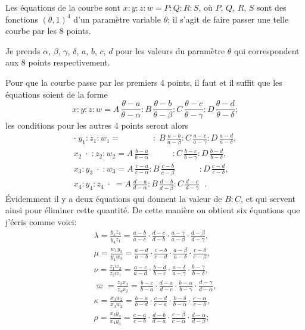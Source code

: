 \documentclass[12pt,a4paper,oneside]{book}
\theoremstyle{plain}
\theoremstyle{definition}
\theoremstyle{remark}
\begin{document}
\smallskip

Les \'equations de la courbe sont $x:y:z:w=P:Q:R:S$, o\`u $P$, $Q$, $R$, $S$ sont des fonctions $(\theta,1)^4$ d'un param\`etre variable $\theta$; il s'agit de faire passer une telle courbe par les 8 points.

Je prends $\alpha$, $\beta$, $\gamma$, $\delta$, $a$, $b$, $c$, $d$ pour les valeurs du param\`etre $\theta$ qui correspondent aux 8 points respectivement.

Pour que la courbe passe par les premiers 4 points, il faut et il suffit que les \'equations soient de la forme
\[
x:y:z:w=A\,\frac{\theta-a}{\theta-\alpha}:B\,\frac{\theta-b}{\theta-\beta}:C\,\frac{\theta-c}{\theta-\gamma}:D\,\frac{\theta-d}{\theta-\delta};
\]
les conditions pour les autres 4 points seront alors
\begin{gather*}
\cdot\; y_1:z_1:w_1=\phantom{=A\frac{b-a}{b-\alpha}}:\; B\,\frac{a-b}{a-\beta}:C\,\frac{a-c}{a-\gamma}:D\,\frac{a-d}{a-\delta},\\
x_2\;\cdot\;:z_2:w_2=A\,\frac{b-a}{b-\alpha}\phantom{:C\frac{b-c}{b-\gamma}}:C\,\frac{b-c}{b-\gamma}:D\,\frac{b-d}{b-\delta},\\
x_3:y_3\;\cdot\;:w_3=A\,\frac{c-a}{c-\alpha}:B\,\frac{c-b}{c-\beta}\phantom{:D\frac{c-d}{c-\delta}}:D\,\frac{c-d}{c-\delta},\\
x_4:y_4:z_4\;\cdot\;=A\,\frac{d-a}{d-\alpha}:B\,\frac{d-b}{d-\beta}:C\,\frac{d-c}{d-\gamma}\phantom{\cdot}.
\end{gather*}
\'Evidemment il y a deux \'equations qui donnent la valeur de $B:C$, et qui servent ainsi pour \'eliminer cette quantit\'e. De cette mani\`ere on obtient six \'equations que j'\'ecris comme voici:
\begin{gather*}
\lambda=\frac{y_1z_4}{y_4z_1}=\frac{a-b}{a-c}\cdot\frac{d-c}{d-b}\cdot\frac{a-\gamma}{a-\beta}\cdot\frac{d-\beta}{d-\gamma},\\
\mu=\frac{w_1y_3}{y_1w_3}=\frac{a-d}{a-b}\cdot\frac{c-b}{c-d}\cdot\frac{a-\beta}{a-\delta}\cdot\frac{c-\delta}{c-\beta},\\
\nu=\frac{z_1w_2}{z_2w_1}=\frac{a-c}{a-d}\cdot\frac{b-d}{b-c}\cdot\frac{a-\delta}{a-\gamma}\cdot\frac{b-\gamma}{b-\delta},\\
\varpi=\frac{z_2x_4}{z_4x_2}=\frac{b-c}{b-a}\cdot\frac{d-a}{d-c}\cdot\frac{b-\alpha}{b-\gamma}\cdot\frac{d-\gamma}{d-\alpha},\\
\kappa=\frac{x_3w_2}{x_3w_2}=\frac{b-a}{b-d}\cdot\frac{c-d}{c-a}\cdot\frac{b-\delta}{b-\alpha}\cdot\frac{c-\alpha}{c-\delta},\\
\rho=\frac{x_3y_4}{x_4y_3}=\frac{c-a}{c-b}\cdot\frac{d-b}{d-a}\cdot\frac{c-\beta}{c-\alpha}\cdot\frac{d-\alpha}{d-\beta};
\end{gather*}
\end{document}
